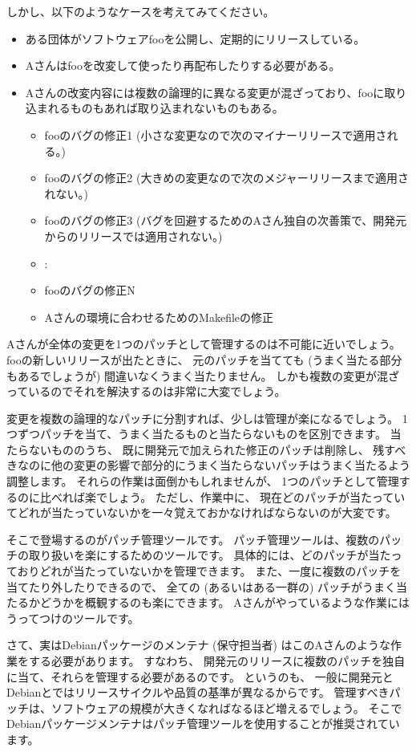 \documentclass[mingoth,a4paper,twoside]{jsarticle}
\begin{document}
しかし、以下のようなケースを考えてみてください。
\begin{itemize}
 \item ある団体がソフトウェアfooを公開し、定期的にリリースしている。
 \item Aさんはfooを改変して使ったり再配布したりする必要がある。
 \item Aさんの改変内容には複数の論理的に異なる変更が混ざっており、fooに取り込まれるものもあれば取り込まれないものもある。
\begin{itemize}
 \item fooのバグの修正1 (小さな変更なので次のマイナーリリースで適用される。)
 \item fooのバグの修正2 (大きめの変更なので次のメジャーリリースまで適用されない。)
 \item fooのバグの修正3 (バグを回避するためのAさん独自の次善策で、開発元からのリリースでは適用されない。)
 \item :
 \item fooのバグの修正N
 \item Aさんの環境に合わせるためのMakefileの修正
\end{itemize}
\end{itemize}

Aさんが全体の変更を1つのパッチとして管理するのは不可能に近いでしょう。
fooの新しいリリースが出たときに、
元のパッチを当てても (うまく当たる部分もあるでしょうが) 間違いなくうまく当たりません。
しかも複数の変更が混ざっているのでそれを解決するのは非常に大変でしょう。

変更を複数の論理的なパッチに分割すれば、少しは管理が楽になるでしょう。
1つずつパッチを当て、うまく当たるものと当たらないものを区別できます。
当たらないもののうち、
既に開発元で加えられた修正のパッチは削除し、
残すべきなのに他の変更の影響で部分的にうまく当たらないパッチはうまく当たるよう調整します。
それらの作業は面倒かもしれませんが、
1つのパッチとして管理するのに比べれば楽でしょう。
ただし、作業中に、
現在どのパッチが当たっていてどれが当たっていないかを一々覚えておかなければならないのが大変です。

そこで登場するのがパッチ管理ツールです。
パッチ管理ツールは、複数のパッチの取り扱いを楽にするためのツールです。
具体的には、どのパッチが当たっておりどれが当たっていないかを管理できます。
また、一度に複数のパッチを当てたり外したりできるので、
全ての (あるいはある一群の) パッチがうまく当たるかどうかを概観するのも楽にできます。
Aさんがやっているような作業にはうってつけのツールです。

さて、実はDebianパッケージのメンテナ (保守担当者) はこのAさんのような作業をする必要があります。
すなわち、
開発元のリリースに複数のパッチを独自に当て、それらを管理する必要があるのです。
というのも、
一般に開発元とDebianとではリリースサイクルや品質の基準が異なるからです。
管理すべきパッチは、ソフトウェアの規模が大きくなればなるほど増えるでしょう。
そこでDebianパッケージメンテナはパッチ管理ツールを使用することが推奨されています。
\end{document}
